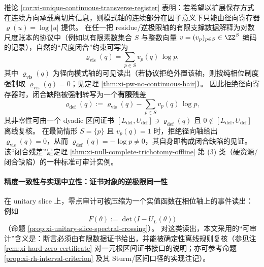 \begin{remark}\label{rem:xi-null-closure-defect-finite-prime-witness}
推论 \ref{cor:xi-unique-continuous-transverse-register} 表明：若希望以扩展保存方式在连续方向承载离切片信息，则模式轴的连续部分在因子意义下只能由径向寄存器 \(\varrho(u)=\log|u|\) 提供。
在任一把 residue/逆极限轴的有限支撑数据解释为对数尺度账本的协议中（例如以有限素数集合 \(S\) 与整数向量 \(v=(v_p)_{p\in S}\in\ZZ^{S}\) 编码的记录），自然的“尺度闭合”约束可写为
\[
\varrho_{\mathrm{vis}}(q)=\sum_{p\in S} v_p(q)\,\log p,
\]
其中 \(\varrho_{\mathrm{vis}}(q)\) 为径向模式轴的可见读出（若协议拒绝外置该轴，则按纯相位制度强制取 \(\varrho_{\mathrm{vis}}(q)=0\)；见定理 \ref{thm:xi-pw-no-continuous-hair}）。
因此拒绝径向寄存器时，闭合缺陷被强制转写为一个\textbf{有限}残差
\[
\varrho_{\mathrm{def}}(q):=\varrho_{\mathrm{vis}}(q)-\sum_{p\in S} v_p(q)\,\log p,
\]
其非零性可由一个 dyadic 区间证书 \([L_{\mathrm{def}},U_{\mathrm{def}}]\ni \varrho_{\mathrm{def}}(q)\) 且 \(0\notin [L_{\mathrm{def}},U_{\mathrm{def}}]\) 离线复核。
在最简情形 \(S=\{p\}\) 且 \(v_p(q)=1\) 时，拒绝径向轴给出 \(\varrho_{\mathrm{vis}}(q)=0\)，从而
\(
\varrho_{\mathrm{def}}(q)=-\log p\neq 0
\)，其自身即构成闭合缺陷的见证。
该“闭合残差”是定理 \ref{thm:xi-null-complete-trichotomy-offline} 第 (3) 类（硬资源/闭合缺陷）的一种标准可审计实例。
\end{remark}

\paragraph{精度一致性与实现中立性：证书对象的逆极限同一性}
在 unitary slice 上，零点审计可被压缩为一个实值函数在相位轴上的事件读出：例如
\[
F(\theta):=\det\!\bigl(I-U_L(\theta)\bigr)
\]
（命题 \ref{prop:xi-unitary-slice-spectral-crossing}）。
对这类读出，本文采用的“可审计”含义是：断言必须由有限数据证书给出，并能被确定性离线规则复核（参见注 \ref{rem:xi-hard-zero-certificate} 对一元根区间证书接口的说明；亦可参考命题 \ref{prop:xi-rh-interval-criterion} 及其 Sturm/区间口径的实现注记）。

